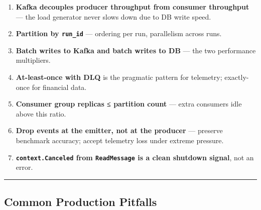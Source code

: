 \documentclass[
]{article}
\providecommand{\tightlist}{%
  \setlength{\itemsep}{0pt}\setlength{\parskip}{0pt}}
\begin{document}
\begin{enumerate}
\def\labelenumi{\arabic{enumi}.}
\tightlist
\item
  \textbf{Kafka decouples producer throughput from consumer throughput}
  --- the load generator never slows down due to DB write speed.
\item
  \textbf{Partition by \texttt{run\_id}} --- ordering per run,
  parallelism across runs.
\item
  \textbf{Batch writes to Kafka and batch writes to DB} --- the two
  performance multipliers.
\item
  \textbf{At-least-once with DLQ} is the pragmatic pattern for
  telemetry; exactly-once for financial data.
\item
  \textbf{Consumer group replicas ≤ partition count} --- extra consumers
  idle above this ratio.
\item
  \textbf{Drop events at the emitter, not at the producer} --- preserve
  benchmark accuracy; accept telemetry loss under extreme pressure.
\item
  \textbf{\texttt{context.Canceled} from \texttt{ReadMessage} is a clean
  shutdown signal}, not an error.
\end{enumerate}

\begin{center}\rule{0.5\linewidth}{0.5pt}\end{center}

\hypertarget{common-production-pitfalls-2}{%
\subsection{Common Production
Pitfalls}\label{common-production-pitfalls-2}}
\end{document}
